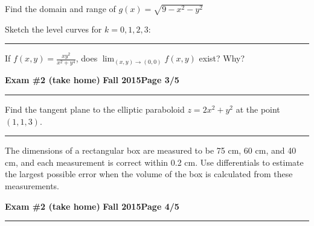 \documentclass[12pt]{article}
\theoremstyle{definition}
\begin{document}
\bigskip
{\problem[15 pts] Find the domain and range of
$g(x)=\sqrt{9-x^2-y^2}$}
\vspace{2.5cm}
\begin{flushright}
\end{flushright}
Sketch the level curves for $k=0,1,2,3$:
\vspace{8cm}
\hrule
{\problem[15 pts] If $f(x,y)=\displaystyle{\frac{xy^2}{x^2+y^4}}$, does
$\displaystyle{\lim_{(x,y)\to(0,0)} f(x,y)}$ exist?  Why?
\newpage

\hfill{\large\bf Exam \#2 (take home)}\hfill{\large\bf
  Fall 2015}\hfill{\large\bf Page 3/5}\hrule

\bigskip
{\problem[15 pts] Find the tangent plane to the elliptic paraboloid
$z=2x^2+y^2$ at the point $(1,1,3)$.}
\vspace{9.5cm}
\begin{flushright}
\end{flushright}
\hrule
{\problem[10 pts] The dimensions of a rectangular box are measured
to be 75 cm, 60 cm, and 40 cm, and each measurement is correct within
0.2 cm.  Use differentials to estimate the largest possible error when
the volume of the box is calculated from these measurements.}
\vspace{7.5cm}
\begin{flushright}
\end{flushright}
\newpage

\hfill{\large\bf Exam \#2 (take home)}\hfill{\large\bf
  Fall 2015}\hfill{\large\bf Page 4/5}\hrule

}
\end{document}
